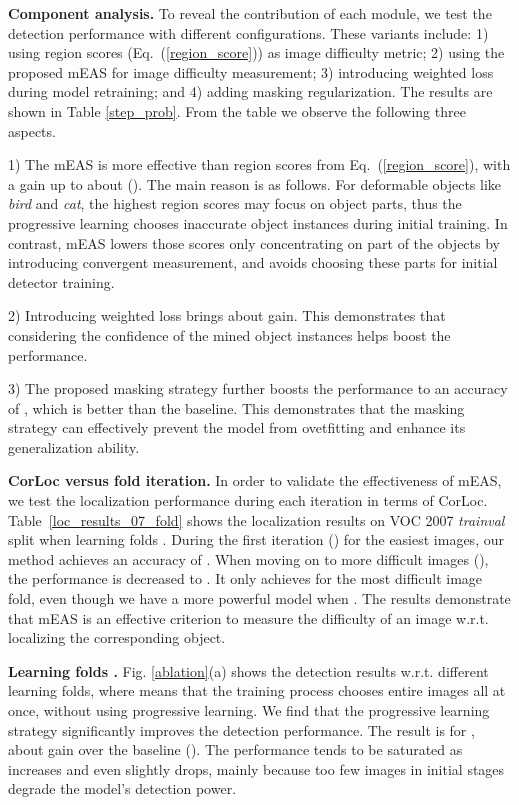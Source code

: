 \documentclass[10pt,twocolumn,letterpaper]{article}
\begin{document}
\noindent  \textbf{Component analysis.} To reveal the contribution of each module, we test the detection performance with different configurations. These variants include: 1) using region scores (Eq.~(\ref{region_score})) as image difficulty metric; 2) using the proposed mEAS for image difficulty measurement; 3) introducing weighted loss during model retraining; and 4) adding masking regularization. The results are shown in Table \ref{step_prob}. From the table we observe the following three aspects.

1) The mEAS is more effective than region scores from
Eq.~(\ref{region_score}), with a gain up to about  (). The main reason is as follows. For deformable objects like \emph{bird} and \emph{cat}, the highest region scores may focus on object parts, thus the progressive learning chooses inaccurate object instances during initial training. In contrast, mEAS lowers those scores only concentrating on part of the objects by introducing convergent measurement, and avoids choosing these parts for initial detector training.

2) Introducing weighted loss brings about  gain. This demonstrates that considering the confidence of the mined object instances helps boost the performance.

3) The proposed masking strategy further boosts the performance to an accuracy of , which is  better than the baseline. This demonstrates that the masking strategy can effectively prevent the model from ovetfitting and enhance its generalization ability.

\noindent  \textbf{CorLoc versus fold iteration.} In order to validate the effectiveness of mEAS, we test the localization performance during each iteration in terms of CorLoc. Table~\ref{loc_results_07_fold} shows the localization results on VOC 2007 \emph{trainval} split when learning folds . During the first iteration () for the easiest images, our method achieves an accuracy of . When moving on to more difficult images (), the performance is decreased to .  It only achieves  for the most difficult image fold, even though we have a more powerful model when . The results demonstrate that mEAS is an effective criterion to measure the difficulty of an image w.r.t. localizing the corresponding object.


\noindent  \textbf{Learning folds .} Fig. \ref{ablation}(a) shows the detection results w.r.t. different learning folds, where  means that the training process chooses entire images all at once, without using progressive learning. We find that the progressive learning strategy significantly improves the detection performance. The result is  for , \ie about  gain over the baseline (). The performance tends to be saturated as  increases and even slightly drops, mainly because too few images in initial stages degrade the model's detection power.
\end{document}
